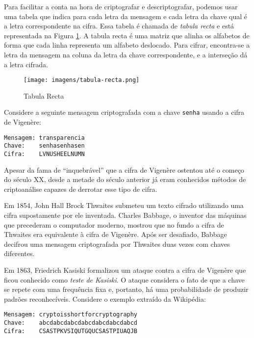 Para facilitar a conta na hora de criptografar e descriptografar, podemos usar uma tabela que indica para cada letra da mensagem e cada letra da chave qual é a letra correspondente na cifra.
Essa tabela é chamada de {\em tabula recta} e está representada na Figura \ref{fig:tabula-recta}.
A tabula recta é uma matriz que alinha os alfabetos de forma que cada linha representa um alfabeto deslocado.
Para cifrar, encontra-se a letra da mensagem na coluna da letra da chave correspondente, e a interseção dá a letra cifrada.

\begin{figure}[htbp]
  \centering
  \texttt{[image: imagens/tabula-recta.png]}
  \caption{Tabula Recta}
  \label{fig:tabula-recta}
\end{figure}


\begin{example}
  Considere a seguinte mensagem criptografada com a chave {\tt senha} usando a cifra de Vigenère:

\begin{verbatim}
Mensagem: transparencia
Chave:    senhasenhasen
Cifra:    LVNUSHEELNUMN
\end{verbatim}
\end{example}

Apesar da fama de ``inquebrável'' que a cifra de Vigenère ostentou até o começo do século XX, desde a metade do século anterior já eram conhecidos métodos de criptoanálise capazes de derrotar esse tipo de cifra.

Em 1854, John Hall Brock Thwaites submeteu um texto cifrado utilizando uma cifra supostamente por ele inventada.
Charles Babbage, o inventor das máquinas que precederam o computador moderno, mostrou que no fundo a cifra de Thwaites era equivalente à cifra de Vigenère.
Após ser desafiado, Babbage decifrou uma mensagem criptografada por Thwaites duas vezes com chaves diferentes.

Em 1863, Friedrich Kasiski formalizou um ataque contra a cifra de Vigenère que ficou conhecido como {\em teste de Kasiski}.
O ataque considera o fato de que a chave se repete com uma frequência fixa e, portanto, há uma probabilidade de produzir padrões reconhecíveis.
Considere o exemplo extraído da Wikipédia:

\begin{example}
\begin{verbatim}
Mensagem: cryptoisshortforcryptography
Chave:    abcdabcdabcdabcdabcdabcdabcd
Cifra:    CSASTPKVSIQUTGQUCSASTPIUAQJB
\end{verbatim}
\end{example}

